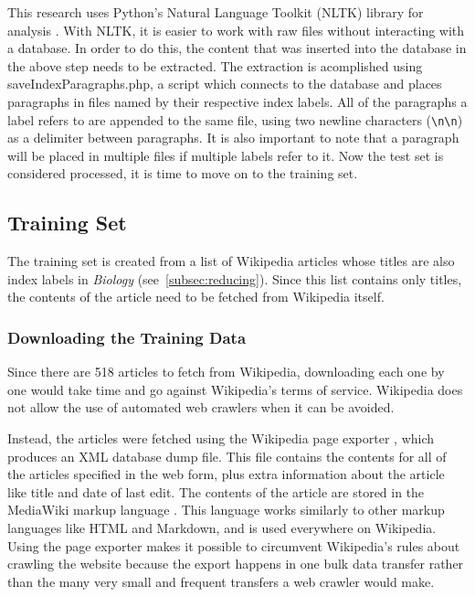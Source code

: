 This research uses Python's Natural Language Toolkit (NLTK) library for analysis \cite{nltk}.
With NLTK, it is easier to work with raw files without interacting with a database.
In order to do this, the content that was inserted into the database in the above step needs to be extracted.
The extraction is acomplished using saveIndexParagraphs.php, a script which connects to the database and places paragraphs in files named by their respective index labels.
All of the paragraphs a label refers to are appended to the same file, using two newline characters ({\tt{\textbackslash}n{\textbackslash}n}) as a delimiter between paragraphs.
It is also important to note that a paragraph will be placed in multiple files if multiple labels refer to it.
Now the test set is considered processed, it is time to move on to the training set.

\subsection{Training Set}

The training set is created from a list of Wikipedia articles whose titles are also index labels in {\it Biology} (see~\ref{subsec:reducing}).
Since this list contains only titles, the contents of the article need to be fetched from Wikipedia itself.

\subsubsection{Downloading the Training Data}

Since there are 518 articles to fetch from Wikipedia, downloading each one by one would take time and go against Wikipedia's terms of service. Wikipedia does not allow the use of automated web crawlers when it can be avoided\cite{wiki-robots}.

Instead, the articles were fetched using the Wikipedia page exporter \cite{wiki-exporter}, which produces an XML database dump file.
This file contains the contents for all of the articles specified in the web form, plus extra information about the article like title and date of last edit.
The contents of the article are stored in the MediaWiki markup language \cite{mediawiki-markup}.
This language works similarly to other markup languages like HTML and Markdown, and is used everywhere on Wikipedia.
Using the page exporter makes it possible to circumvent Wikipedia's rules about crawling the website because the export happens in one bulk data transfer rather than the many very small and frequent transfers a web crawler would make.

